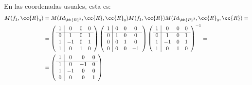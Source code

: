 \begin{ejercicio}
\begin{enumerate}
        En las coordenadas usuales, esta es:
        \begin{equation*}
            \begin{split}
                M(f_1,\cc{R}_0) &= M(Id_{\bb{R}^3},\cc{R}, \cc{R}_0) M(f_1,\cc{R}) M(Id_{\bb{R}^3},\cc{R}_0, \cc{R}) =\\
                &= 
                \left(
                \begin{array}{c|ccc}
                    1 & 0 & 0 & 0 \\ \hline
                    0 & 1 & 0 & 1 \\
                    1 & -1 & 0 & 1 \\
                    1 & 0 & 1 & 0
                \end{array}
                \right)
                \left(
                \begin{array}{c|ccc}
                    1 & 0 & 0 & 0 \\ \hline
                    0 & 1 & 0 & 0 \\
                    0 & 0 & 1 & 0 \\
                    0 & 0 & 0 & -1
                \end{array}
                \right)
                \left(
                \begin{array}{c|ccc}
                    1 & 0 & 0 & 0 \\ \hline
                    0 & 1 & 0 & 1 \\
                    1 & -1 & 0 & 1 \\
                    1 & 0 & 1 & 0
                \end{array}
                \right)^{-1}
                =\\
                &=  \left(
                \begin{array}{c|ccc}
                    1 & 0 & 0 & 0 \\ \hline
                    1 & 0 & -1 & 0 \\
                    1 & -1 & 0 & 0 \\
                    0 & 0 & 0 & 1
                \end{array}
                \right)
            \end{split} 
        \end{equation*}




\end{enumerate}
\end{ejercicio}
